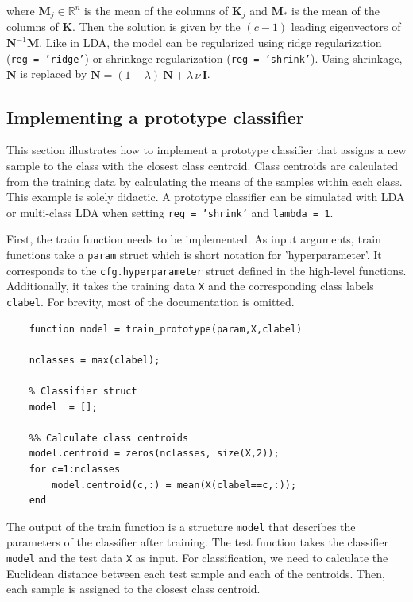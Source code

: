 \documentclass[utf8]{frontiersSCNS} %
\newcommand{\I}{\mathbf{I}}
\newcommand{\K}{\mathbf{K}}
\newcommand{\M}{\mathbf{M}}
\newcommand{\R}{\mathbb{R}}
\newcommand{\ttt}[1]{\texttt{#1}}
\begin{document}
where $\M_j\in\R^n$ is the mean of the columns of $\K_j$ and $\M_*$ is the mean of the columns of $\K$. Then the solution is given by the $(c-1)$ leading eigenvectors of $\mathbf{N}^{-1} \mathbf{M}$.
Like in LDA, the model can be regularized using ridge regularization (\ttt{reg = 'ridge'}) or shrinkage regularization (\ttt{reg = 'shrink'}). Using shrinkage, $\mathbf{N}$ is replaced by $\widetilde{\mathbf{N}} = (1-\lambda)\ \mathbf{N} + \lambda\,\nu\,\I$.


\subsection{Implementing a prototype classifier}

This section illustrates how to implement a prototype classifier that assigns a new sample to the class with the closest class centroid. Class centroids are calculated from the training data by calculating the means of the samples within each class. This example is solely didactic. A prototype classifier can be simulated with LDA or multi-class LDA when setting \ttt{reg = 'shrink'} and \ttt{lambda = 1}.

First, the train function needs to be implemented. As input arguments, train functions take a \ttt{param} struct which is short notation for 'hyperparameter'. It corresponds to the \ttt{cfg.hyperparameter} struct defined in the high-level functions. Additionally, it takes the training data \ttt{X} and the corresponding class labels \ttt{clabel}. For brevity, most of the documentation is omitted.

\begin{verbatim}
    function model = train_prototype(param,X,clabel)

    nclasses = max(clabel);

    % Classifier struct
    model  = [];

    %% Calculate class centroids
    model.centroid = zeros(nclasses, size(X,2));
    for c=1:nclasses
        model.centroid(c,:) = mean(X(clabel==c,:));
    end
\end{verbatim}

The output of the train function is a structure \ttt{model} that describes the parameters of the classifier after training. The test function takes the classifier \ttt{model} and the test data \ttt{X} as input. For classification, we need to calculate the Euclidean distance between each test sample and each of the centroids. Then, each sample is assigned to the closest class centroid.
\end{document}
